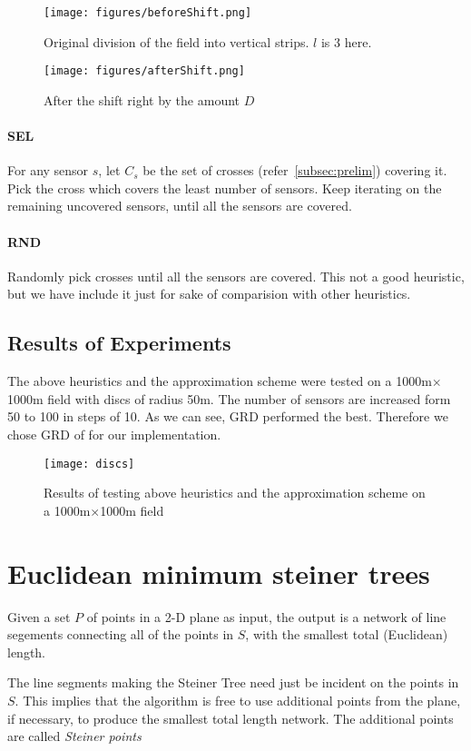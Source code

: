 \begin{figure}[H]

\texttt{[image: figures/beforeShift.png]}
\caption{Original division of the field into vertical strips. $l$ is 3 here.} \label{fig:origStrip}

\end{figure}

\begin{figure}[H]

\texttt{[image: figures/afterShift.png]}

\caption{After the shift right by the amount $D$}\label{fig:shiftStrip}

\end{figure}

\paragraph*{SEL} 
  
For any sensor $s$, let $C_s$ be the set of crosses 
(refer~\ref{subsec:prelim}) covering it. Pick the cross which covers the 
least number of sensors. Keep iterating on the remaining uncovered sensors, until all the sensors are covered.

\paragraph*{RND} Randomly pick crosses until all the sensors are covered. This not a good heuristic, but we have include it just for sake of comparision with other heuristics.

\subsection{Results of Experiments}

The above heuristics and the approximation scheme were tested on a 1000m$\times$1000m field with discs of radius 50m. The number of sensors are increased form 50 to 100 in steps of 10. As we can see, GRD performed the best. Therefore we chose GRD of for our implementation.

\begin{figure}[H]
\texttt{[image: discs]}
\caption{Results of testing above heuristics and the approximation scheme on a 1000m$\times$1000m field}\label{fig:discResults}
\end{figure}

\section{Euclidean minimum steiner trees}
\begin{definition}
Given a set $P$ of points in a 2-D plane as input, the output is a network of line segements connecting all of the points in $S$, with the smallest total (Euclidean) length.
\end{definition}
The line segments making the Steiner Tree need just be incident on the points in $S$. This implies that the algorithm is free to use additional points from the plane, if necessary, to produce the smallest total length network. The additional points are called \emph{Steiner points}

